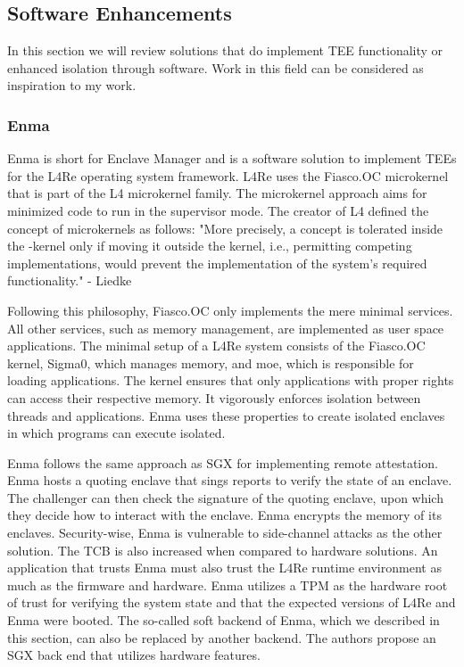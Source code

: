 \subsection{Software Enhancements}
In this section we will review solutions that do implement TEE functionality or enhanced isolation through software.
Work in this field can be considered as inspiration to my work.

\subsubsection{Enma}
\label{sec:20:enma}
Enma is short for Enclave Manager and is a software solution to implement TEEs for the L4Re operating system framework.
\cite{reitz_isolierende_2019}
L4Re uses the Fiasco.OC microkernel that is part of the L4 microkernel family. The microkernel approach aims for
minimized code to run in the supervisor mode. The creator of L4 defined the concept of microkernels as follows:
"More precisely, a concept is tolerated inside the \mu-kernel only if moving it outside the kernel, i.e., permitting
competing implementations, would prevent the implementation of the system's required functionality."
- Liedke\cite{liedtke1995micro}

Following this philosophy, Fiasco.OC only implements the mere minimal services. All other services, such as memory
management, are implemented as user space applications. The minimal setup of a L4Re system consists of the Fiasco.OC
kernel, Sigma0, which manages memory, and moe, which is responsible for loading applications. The kernel ensures that only
applications with proper rights can access their respective memory. It vigorously enforces isolation between threads and
applications. Enma uses these properties to create isolated enclaves in which programs can execute isolated.

Enma follows the same approach as SGX for implementing remote attestation. Enma
hosts a quoting enclave that sings reports to verify the state of an enclave. The challenger can then check the
signature of the quoting enclave, upon which they decide how to interact with the enclave. Enma encrypts the memory of
its enclaves. Security-wise, Enma is vulnerable to side-channel attacks as the other solution. The TCB is also increased
when compared to hardware solutions. An application that trusts Enma must also trust the L4Re runtime environment as
much as the firmware and hardware. Enma utilizes a TPM as the hardware root of trust for verifying the system state and
that the expected versions of L4Re and Enma were booted. The so-called soft backend of Enma, which we described in this
section, can also be replaced by another backend. The authors propose an SGX back end that utilizes hardware features.

